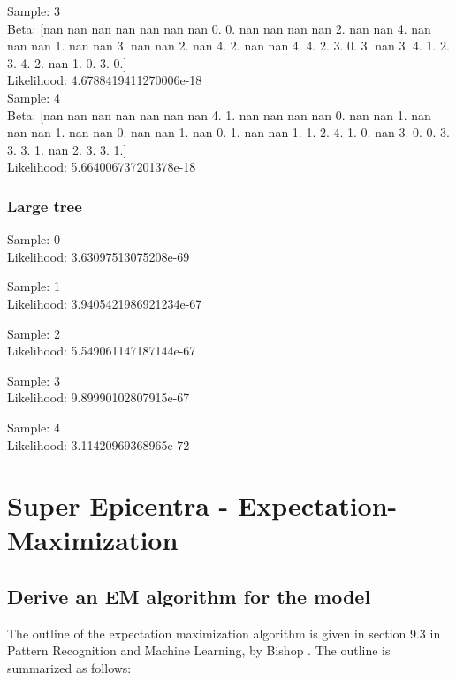 \documentclass[11pt,a4paper]{article}
\begin{document}
	Sample:  3\\ 	Beta:  [nan nan nan nan nan nan nan  0.  0. nan nan nan nan  2. nan nan  4. nan
 nan nan  1. nan nan  3. nan nan  2. nan  4.  2. nan nan  4.  4.  2.  3.
  0.  3. nan  3.  4.  1.  2.  3.  4.  2. nan  1.  0.  3.  0.]\\
	Likelihood:  4.6788419411270006e-18\\

	Sample:  4\\ 	Beta:  [nan nan nan nan nan nan nan  4.  1. nan nan nan nan  0. nan nan  1. nan
 nan nan  1. nan nan  0. nan nan  1. nan  0.  1. nan nan  1.  1.  2.  4.
  1.  0. nan  3.  0.  0.  3.  3.  3.  1. nan  2.  3.  3.  1.]\\
	Likelihood:  5.664006737201378e-18\\

\subsubsection{Large tree}

Sample:  0 	\\
	Likelihood:  3.63097513075208e-69

	Sample:  1 	\\
	Likelihood:  3.9405421986921234e-67

	Sample:  2 	\\
	Likelihood:  5.549061147187144e-67

	Sample:  3 	\\
	Likelihood:  9.89990102807915e-67

	Sample:  4\\
	Likelihood:  3.11420969368965e-72

\section{Super Epicentra - Expectation-Maximization}

\subsection{Derive an EM algorithm for the model}

The outline of the expectation maximization algorithm is given in section 9.3 in Pattern Recognition and Machine Learning, by Bishop \cite{book}. The outline is summarized as follows:\\
\end{document}
